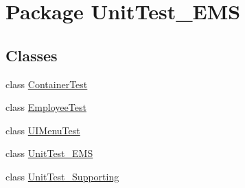 \hypertarget{namespace_unit_test___e_m_s}{\section{Package Unit\-Test\-\_\-\-E\-M\-S}
\label{namespace_unit_test___e_m_s}
}
\subsection*{Classes}
\begin{DoxyCompactItemize}
\item 
class \hyperlink{class_unit_test___e_m_s_1_1_container_test}{Container\-Test}
\item 
class \hyperlink{class_unit_test___e_m_s_1_1_employee_test}{Employee\-Test}
\item 
class \hyperlink{class_unit_test___e_m_s_1_1_u_i_menu_test}{U\-I\-Menu\-Test}
\item 
class \hyperlink{class_unit_test___e_m_s_1_1_unit_test___e_m_s}{Unit\-Test\-\_\-\-E\-M\-S}
\item 
class \hyperlink{class_unit_test___e_m_s_1_1_unit_test___supporting}{Unit\-Test\-\_\-\-Supporting}
\end{DoxyCompactItemize}

